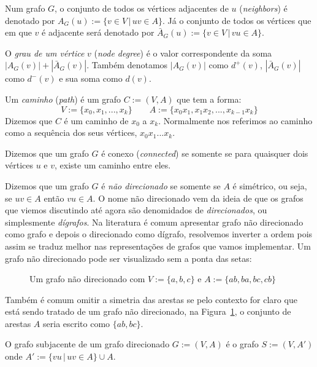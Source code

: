 \begin{mydef}
  Num grafo $G$, o conjunto de todos os vértices adjacentes de $u$
  (\textit{neighbors}) é denotado por $A_G(u) := \{v \in V\, |\, uv \in
  A\}$. Já o conjunto de todos os vértices que em que $v$ é adjacente
  será denotado por $\bar{A}_G(u) := \{ v \in V\, |\, vu \in A\}$.
\end{mydef}

\begin{mydef}
  O \emph{grau de um vértice} $v$ (\textit{node degree}) é o valor
  correspondente da soma $|A_G(v)| + |\bar{A}_G(v)|$. Também
  denotamos $|A_G(v)|$ como $d^+(v)$, $|\bar{A}_G(v)|$ como $d^-(v)$ e
  sua soma como $d(v)$.
\end{mydef}

\begin{mydef}[Caminho]
  Um \emph{caminho} (\textit{path}) é um grafo $C := (V, A)$ que tem a forma:
  \begin{displaymath}
    V := \{x_0, x_1,...,x_k\} \qquad A := \{x_0x_1,x_1x_2,...,x_{k-1}x_k\}
  \end{displaymath}
  Dizemos que $C$ é um caminho de $x_0$ a $x_k$. Normalmente nos
  referimos ao caminho como a sequência dos seus vértices, $x_0x_1...x_k$.
\end{mydef}

\begin{mydef}[Conectividade]
  Dizemos que um grafo $G$ é conexo (\textit{connected}) se somente
  se para quaisquer dois vértices $u$ e $v$, existe um caminho entre eles.
\end{mydef}

\begin{mydef}
  Dizemos que um grafo $G$ é \emph{não direcionado} se somente se $A$ é
  simétrico, ou seja, se $uv \in A$ então $vu \in A$. O nome não
  direcionado vem da ideia de que os grafos que viemos discutindo até
  agora são denomidados de \emph{direcionados}, ou simplesmente
  \emph{dígrafos}. Na
  literatura é comum apresentar grafo não direcionado como grafo e
  depois o direcionado como dígrafo, resolvemos inverter a ordem pois
  assim se traduz melhor nas representações de grafos que vamos
  implementar. Um grafo não direcionado pode ser visualizado sem a
  ponta das setas:

  \begin{figure}[h]
    \centering
    \caption{Um grafo não direcionado com $V := \{a,b,c\}$ e $A :=
    \{ab,ba,bc,cb\}$}
    \label{fig:ungraph1}
  \end{figure}

  Também é comum omitir a simetria das arestas se pelo contexto for
  claro que está sendo tratado de um grafo não direcionado, na
  Figura~\ref{fig:ungraph1}, o conjunto de arestas $A$ seria escrito
  como $\{ab,bc\}$.
\end{mydef}

\begin{mydef}
  O grafo subjacente de um grafo direcionado $G := (V, A)$ é o grafo
  $S := (V, A')$ onde $A' := \{vu\, |\, uv \in A\} \cup A$.
\end{mydef}

